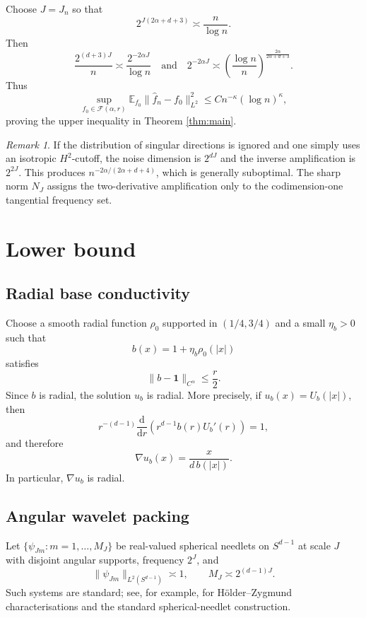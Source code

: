 \documentclass[11pt,a4paper]{article}
\theoremstyle{remark}
\newtheorem{remark}[theorem]{Remark}
\numberwithin{equation}{section}
\newcommand{\E}{\mathbb{E}}
\newcommand{\bone}{\mathbf 1}
\newcommand{\dd}{\mathrm d}
\newcommand{\Fcal}{\mathcal F}
\begin{document}
Choose $J=J_n$ so that
\[
2^{J(2\alpha+d+3)}\asymp \frac n{\log n}.
\]
Then
\[
\frac{2^{(d+3)J}}n
\asymp
\frac{2^{-2\alpha J}}{\log n}
\quad\text{and}\quad
2^{-2\alpha J}
\asymp
\left(\frac{\log n}{n}\right)^{\frac{2\alpha}{2\alpha+d+3}}.
\]
Thus
\[
\sup_{f_0\in\Fcal(\alpha,r)}
\E_{f_0}\|\widehat f_n-f_0\|_{L^2}^2
\leq
C n^{-\kappa}(\log n)^\kappa,
\]
proving the upper inequality in Theorem \ref{thm:main}.

\begin{remark}
If the distribution of singular directions is ignored and one simply uses
an isotropic $H^2$-cutoff, the noise dimension is $2^{dJ}$ and the inverse
amplification is $2^{2J}$. This produces
$n^{-2\alpha/(2\alpha+d+4)}$, which is generally suboptimal. The sharp
norm $N_J$ assigns the two-derivative amplification only to the
codimension-one tangential frequency set.
\end{remark}

\section{Lower bound}

\subsection{Radial base conductivity}

Choose a smooth radial function $\rho_0$ supported in
$(1/4,3/4)$ and a small $\eta_b>0$ such that
\[
b(x)=1+\eta_b\rho_0(|x|)
\]
satisfies
\[
\|b-\bone\|_{C^\alpha}\leq \frac r2.
\]
Since $b$ is radial, the solution $u_b$ is radial. More precisely, if
$u_b(x)=U_b(|x|)$, then
\[
r^{-(d-1)}\frac{\dd}{\dd r}
\left(r^{d-1}b(r)U_b'(r)\right)=1,
\]
and therefore
\begin{equation}\label{eq:radial-gradient}
\nabla u_b(x)
=
\frac{x}{d\,b(|x|)}.
\end{equation}
In particular, $\nabla u_b$ is radial.

\subsection{Angular wavelet packing}

Let $\{\psi_{Jm}:m=1,\ldots,M_J\}$ be real-valued spherical needlets on
$S^{d-1}$ at scale $J$ with disjoint angular supports, frequency $2^J$, and
\[
\|\psi_{Jm}\|_{L^2(S^{d-1})}\asymp 1,
\qquad
M_J\asymp 2^{(d-1)J}.
\]
Such systems are standard; see, for example, \cite{Triebel} for
H\"older--Zygmund characterisations and the standard spherical-needlet
construction.
\end{document}
